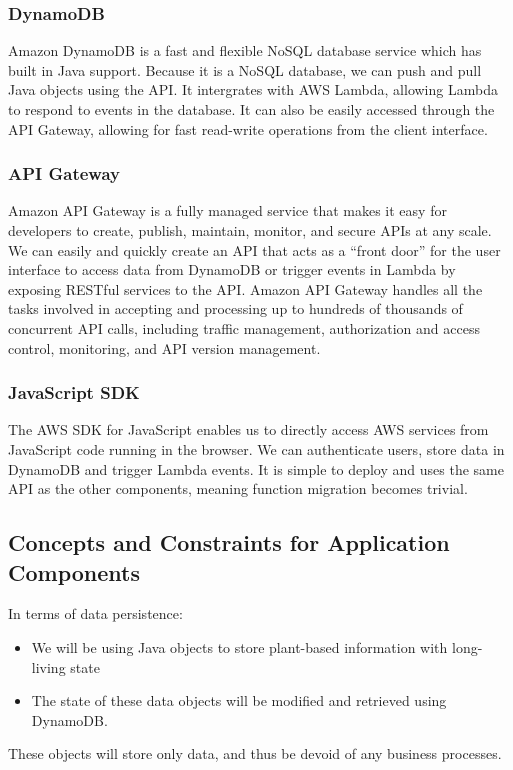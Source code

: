 \documentclass{article}
\begin{document}
	\subsubsection{DynamoDB}
		Amazon DynamoDB is a fast and flexible NoSQL database service which has built in Java support. Because it is a NoSQL database, we can push and pull Java objects using the API. It intergrates with AWS Lambda, allowing Lambda to respond to events in the database. It can also be easily accessed through the API Gateway, allowing for fast read-write operations from the client interface.
	\subsubsection{API Gateway}
		Amazon API Gateway is a fully managed service that makes it easy for developers to create, publish, maintain, monitor, and secure APIs at any scale. We can easily and quickly create an API that acts as a “front door” for the user interface to access data from DynamoDB or trigger events in Lambda by exposing RESTful services to the API. Amazon API Gateway handles all the tasks involved in accepting and processing up to hundreds of thousands of concurrent API calls, including traffic management, authorization and access control, monitoring, and API version management.
	\subsubsection{JavaScript SDK}
		The AWS SDK for JavaScript enables us to directly access AWS services from JavaScript code running in the browser. We can authenticate users, store data in DynamoDB and trigger Lambda events. It is simple to deploy and uses the same API as the other components, meaning function migration becomes trivial.

\subsection{Concepts and Constraints for Application Components}
In terms of data persistence:
\begin{itemize}
	\item We will be using Java objects to store plant-based information with long-living state
	\item The state of these data objects will be modified and retrieved using DynamoDB.
\end{itemize}
These objects will store only data, and thus be devoid of any business processes.
\end{document}
